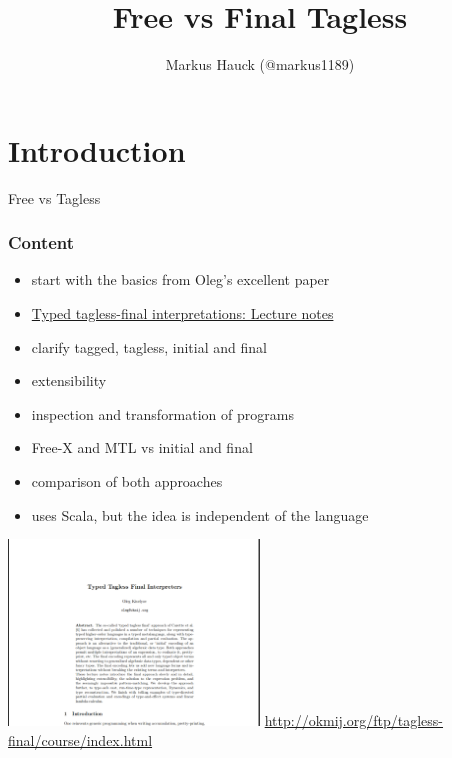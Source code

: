 \documentclass[aspectratio=169, hyperref={colorlinks, linkcolor=beamer@centricgreen}, urlcolor=links]{beamer}
\title{Free vs Final Tagless}
\author{Markus Hauck (@markus1189)}
\begin{document}
\begin{frame}
  \titlepage{}
\end{frame}

\section{Introduction}\label{sec:introduction}

\begin{frame}
  \begin{center}
    {\Huge Free vs Tagless}
  \end{center}
\end{frame}

\begin{frame}[fragile]
  \frametitle{Content}
  \begin{itemize}
  \item start with the basics from Oleg's excellent paper
  \item \href{http://okmij.org/ftp/tagless-final/course/index.html}{Typed tagless-final interpretations: Lecture notes}
  \item clarify tagged, tagless, initial and final
  \item extensibility
  \item inspection and transformation of programs
  \item Free-X and MTL vs initial and final
  \item comparison of both approaches
  \item uses Scala, but the idea is independent of the language
  \end{itemize}
\end{frame}

\begin{frame}
  \begin{center}
    \includegraphics[width=0.5\textwidth]{static-images/final-tagless.png}
    \vfill
    \href{http://okmij.org/ftp/tagless-final/course/index.html}{http://okmij.org/ftp/tagless-final/course/index.html}
  \end{center}
\end{frame}
\end{document}
